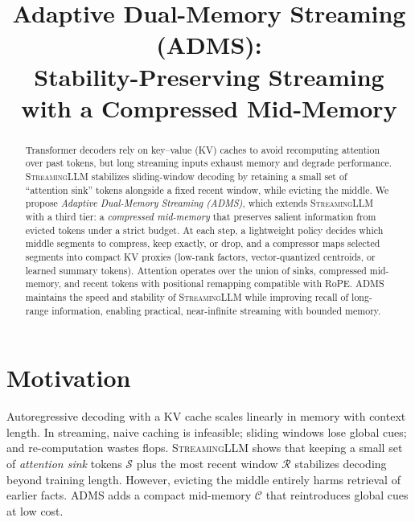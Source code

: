 \documentclass[11pt]{article}
\title{Adaptive Dual-Memory Streaming (ADMS):\\
Stability-Preserving Streaming with a Compressed Mid-Memory}
\author{}
\date{}
\newcommand{\model}{\textsc{ADMS}} %
\newcommand{\streaming}{\textsc{StreamingLLM}}
\newcommand{\kv}{KV}
\newcommand{\sink}{\mathcal{S}}
\newcommand{\recent}{\mathcal{R}}
\newcommand{\compressed}{\mathcal{C}}
\begin{document}
\maketitle

\begin{abstract}
Transformer decoders rely on key--value (\kv) caches to avoid recomputing attention over past tokens, but long streaming inputs exhaust memory and degrade performance. \streaming{} stabilizes sliding-window decoding by retaining a small set of ``attention sink'' tokens alongside a fixed recent window, while evicting the middle. We propose \emph{Adaptive Dual-Memory Streaming (ADMS)}, which extends \streaming{} with a third tier: a \emph{compressed mid-memory} that preserves salient information from evicted tokens under a strict budget. At each step, a lightweight policy decides which middle segments to compress, keep exactly, or drop, and a compressor maps selected segments into compact \kv{} proxies (low-rank factors, vector-quantized centroids, or learned summary tokens). Attention operates over the union of sinks, compressed mid-memory, and recent tokens with positional remapping compatible with RoPE. \model{} maintains the speed and stability of \streaming{} while improving recall of long-range information, enabling practical, near-infinite streaming with bounded memory.
\end{abstract}

\section{Motivation}
Autoregressive decoding with a \kv{} cache scales linearly in memory with context length. In streaming, naive caching is infeasible; sliding windows lose global cues; and re-computation wastes flops. \streaming{} shows that keeping a small set of \emph{attention sink} tokens $\sink$ plus the most recent window $\recent$ stabilizes decoding beyond training length. However, evicting the middle entirely harms retrieval of earlier facts. \model{} adds a compact mid-memory $\compressed$ that reintroduces global cues at low cost.
\end{document}

